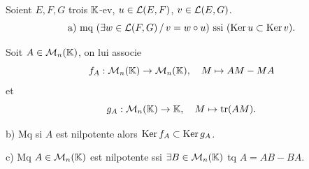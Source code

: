 
\providecommand{\Sp}{\operatorname{Sp}}
\providecommand{\mat}{\operatorname{mat}}
\providecommand{\diag}{\operatorname{diag}}


\begin{statementbox}
Soient $E,F,G$ trois $\mathbb K$-ev, $u\in\mathcal L(E,F)$, $v\in\mathcal L(E,G)$.
\[
\text{a) mq }(\exists w\in\mathcal L(F,G)\,/\,v=w\circ u)\ \text{ssi }(\operatorname{Ker} u\subset\operatorname{Ker} v).
\]

Soit $A\in\mathcal M_n(\mathbb K)$, on lui associe
\[
f_A:\mathcal M_n(\mathbb K)\to\mathcal M_n(\mathbb K),\quad M\mapsto AM-MA
\]
et
\[
g_A:\mathcal M_n(\mathbb K)\to\mathbb K,\quad M\mapsto \operatorname{tr}(AM).
\]

b) Mq si $A$ est nilpotente alors $\operatorname{Ker} f_A\subset\operatorname{Ker} g_A$.

c) Mq $A\in\mathcal M_n(\mathbb K)$ est nilpotente ssi $\exists B\in\mathcal M_n(\mathbb K)$ tq $A=AB-BA$.
\end{statementbox}

